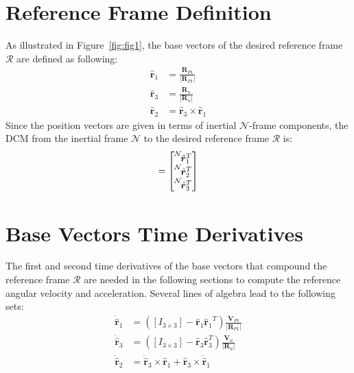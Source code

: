 \documentclass[]{AVSSimReportMemo}
\begin{document}
\section{Reference Frame Definition}
As illustrated in Figure~\ref{fig:fig1}, the base vectors of the desired reference frame $\mathcal{R}$  are defined as following:
\begin{subequations}
	\begin{align}
		\hat{\bm r}_{1} &= \frac{{\bm R}_{P1}} {|{\bm R}_{P1}|} \\
		\hat{\bm r}_{3} &= \frac{{\bm R}_{n}}{|{\bm R}_{n}|} \\
		\hat{\bm r}_{2} &=  \hat{\bm r}_{3} \times \hat{\bm r}_{1}
	\end{align}
\end{subequations}
Since the position vectors are given in terms of inertial $\mathcal{N}$-frame components, the DCM from the inertial frame $\mathcal{N}$ to the desired reference frame $\mathcal{R}$ is:
\begin{equation}
	[RN] = \begin{bmatrix}
		\leftexp{N}{ \hat{\bm r}_{1}^{T} } \\
		\leftexp{N}{ \hat{\bm r}_{2}^{T} }  \\
		\leftexp{N}{ \hat{\bm r}_{3}^{T} }
	\end{bmatrix}
\end{equation}
\section{Base Vectors Time Derivatives}
The first and second time derivatives of the base vectors that compound the reference frame $\mathcal{R}$ are needed in the following sections to compute the reference angular velocity and acceleration. Several lines of algebra lead to the following sets:
\begin{subequations}
	\begin{align}
		\dot{\hat{\bm{r}}}_1 &= ([I_{3\times3}] - {\hat{\bm{r}}_1}{\hat{\bm{r}}_1}^T)  \frac{{\bm V}_{P1}} {|{\bm R}_{P1}|} \\
		\dot{\hat{\bm{r}}}_3 &= ([I_{3\times3}] - \hat{\bm{r}}_3 \hat{\bm{r}}_3^T)  \frac{{\bm V}_{n}} {|{\bm R}_{n}|} \\
		\dot{\hat{\bm{r}}}_2 &= \dot{\hat{\bm{r}}}_3 \times \hat{\bm{r}}_1 +  \hat{\bm{r}}_3  \times \dot{\hat{\bm{r}}}_1
	\end{align}
\end{subequations}
\end{document}
